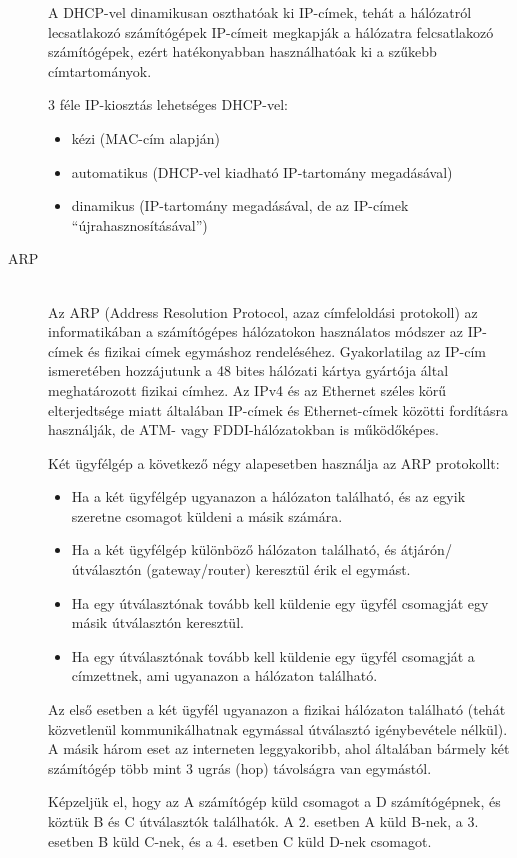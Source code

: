 \documentclass[margin=0px]{article}
\begin{document}
\begin{description}
        A DHCP-vel dinamikusan oszthatóak ki IP-címek, tehát a hálózatról lecsatlakozó számítógépek IP-címeit megkapják a hálózatra felcsatlakozó számítógépek, ezért hatékonyabban használhatóak ki a szűkebb címtartományok.

        3 féle IP-kiosztás lehetséges DHCP-vel:
        \begin{itemize}
            \item kézi (MAC-cím alapján)
            \item automatikus (DHCP-vel kiadható IP-tartomány megadásával)
            \item dinamikus (IP-tartomány megadásával, de az IP-címek ``újrahasznosításával'')
        \end{itemize}

    \item[ARP] \hfill \\
        Az ARP (Address Resolution Protocol, azaz címfeloldási protokoll) az informatikában a számítógépes hálózatokon használatos módszer az IP-címek és fizikai címek egymáshoz rendeléséhez. Gyakorlatilag az IP-cím ismeretében hozzájutunk a 48 bites hálózati kártya gyártója által meghatározott fizikai címhez. Az IPv4 és az Ethernet széles körű elterjedtsége miatt általában IP-címek és Ethernet-címek közötti fordításra használják, de ATM- vagy FDDI-hálózatokban is működőképes.

        Két ügyfélgép a következő négy alapesetben használja az ARP protokollt:
        \begin{itemize}
            \item Ha a két ügyfélgép ugyanazon a hálózaton található, és az egyik szeretne csomagot küldeni a másik számára.
            \item Ha a két ügyfélgép különböző hálózaton található, és átjárón/útválasztón (gateway/router) keresztül érik el egymást.
            \item Ha egy útválasztónak tovább kell küldenie egy ügyfél csomagját egy másik útválasztón keresztül.
            \item Ha egy útválasztónak tovább kell küldenie egy ügyfél csomagját a címzettnek, ami ugyanazon a hálózaton található.
        \end{itemize}

        Az első esetben a két ügyfél ugyanazon a fizikai hálózaton található (tehát közvetlenül kommunikálhatnak egymással útválasztó igénybevétele nélkül). A másik három eset az interneten leggyakoribb, ahol általában bármely két számítógép több mint 3 ugrás (hop) távolságra van egymástól.

        Képzeljük el, hogy az A számítógép küld csomagot a D számítógépnek, és köztük B és C útválasztók találhatók. A 2. esetben A küld B-nek, a 3. esetben B küld C-nek, és a 4. esetben C küld D-nek csomagot.
\end{description}
\end{document}
